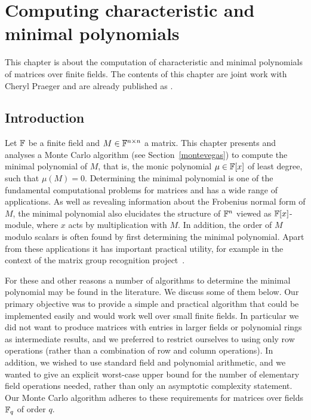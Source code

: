 
\chapter{Computing characteristic and minimal polynomials}
\label{chap:charminpoly}
%

This chapter is about the computation of characteristic and minimal
polynomials of matrices over finite fields. The contents of this
chapter are joint work with Cheryl
Praeger and are already published as \cite{minpolypaper}.

\section{Introduction}

Let $\mathbb{F}$ be a finite field and $M \in \mathbb{F}^{n \times n}$ a matrix. This
chapter
presents and analyses a Monte Carlo  algorithm (see
Section~\ref{montevegas}) to compute the minimal 
polynomial of $M$, that is,
the monic polynomial $\mu \in \mathbb{F}[x]$ of least degree, such that
$\mu(M) = 0$. 
Determining the minimal polynomial is one of the fundamental computational
problems for matrices and has a wide range of applications. As well as 
revealing information about the Frobenius
normal form of $M$, the minimal polynomial also elucidates the structure 
of $\mathbb{F}^n$ viewed as $\mathbb{F}[x]$-module, where $x$ acts by multiplication with $M$. 
In addition, the order of $M$ modulo scalars is often found by first 
determining the minimal polynomial. Apart from these applications it has
important practical utility, for example
in the context of the matrix group recognition project~\cite{OB}.

For these and other reasons a number of algorithms to determine the 
minimal polynomial may be found in the literature. We discuss some 
of them below. Our primary objective 
was to provide a simple and practical algorithm that could be 
implemented easily and would work well over small finite fields. In
particular we did not want to produce matrices with entries in 
larger fields or polynomial rings as intermediate results, 
and we preferred to restrict ourselves to using only row operations 
(rather than a combination of row and column operations). 
In addition, we wished to use standard field and polynomial arithmetic,
and we wanted to give  an explicit worst-case upper bound
for the number of elementary field operations needed, rather than only an
asymptotic complexity statement.
Our Monte Carlo algorithm adheres to these requirements for matrices 
over fields $\mathbb{F}_q$ of order $q$.


